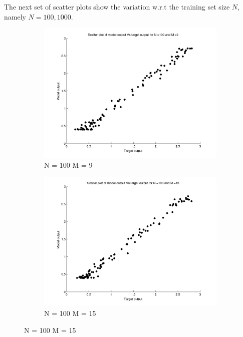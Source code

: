 \documentclass{article}
\begin{document}
The next set of scatter plots show the variation w.r.t the training set size $N$, namely $N = 100, 1000$.

\begin{figure}[H]

\begin{subfigure}{.5\textwidth}
\centering
\includegraphics[width=\linewidth]{Scatter_1/VaryingN_N100M9}
\caption{N = 100 M = 9}
\end{subfigure}
\begin{subfigure}{.5\textwidth}
\includegraphics[width=\linewidth]{Scatter_1/VaryingN_N100M15}
\caption{N = 100 M = 15}
\end{subfigure}



\end{figure}
\end{document}
